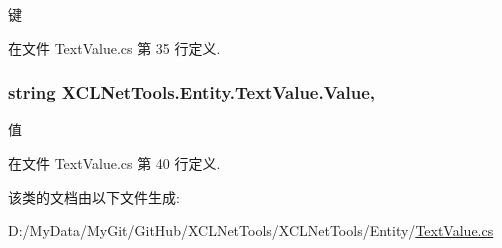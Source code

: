 键 



在文件 Text\-Value.\-cs 第 35 行定义.

\hypertarget{class_x_c_l_net_tools_1_1_entity_1_1_text_value_a8a193486b942adc898433bd29db3eff7}{
\subsubsection[{Value}]{\setlength{\rightskip}{0pt plus 5cm}string X\-C\-L\-Net\-Tools.\-Entity.\-Text\-Value.\-Value\hspace{0.3cm}{\ttfamily [get]}, {\ttfamily [set]}}}\label{class_x_c_l_net_tools_1_1_entity_1_1_text_value_a8a193486b942adc898433bd29db3eff7}


值 



在文件 Text\-Value.\-cs 第 40 行定义.



该类的文档由以下文件生成\-:\begin{DoxyCompactItemize}
\item 
D\-:/\-My\-Data/\-My\-Git/\-Git\-Hub/\-X\-C\-L\-Net\-Tools/\-X\-C\-L\-Net\-Tools/\-Entity/\hyperlink{_text_value_8cs}{Text\-Value.\-cs}\end{DoxyCompactItemize}
